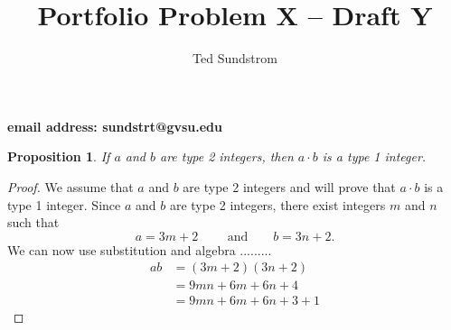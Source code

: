 \documentclass[12pt]{article}
\title{Portfolio Problem X -- Draft Y}
\author{Ted Sundstrom}
\theoremstyle{plain}
\newtheorem{proposition}[theorem]{Proposition}
\begin{document}
\maketitle

\begin{center}
\textbf{email address: sundstrt@gvsu.edu}
\end{center}

\begin{proposition}
If $a$ and $b$ are type 2 integers, then $a \cdot b$ is a type 1 integer.
\end{proposition}

\begin{proof}
We assume that $a$ and $b$ are type 2 integers and will prove that $a \cdot b$ is a type 1 integer.  Since $a$ and $b$ are type 2 integers, there exist integers $m$ and $n$ such that
\[
a = 3m + 2 \text{ ~~~~~~and~~~~~ } b = 3n + 2.
\]
We can now  use substitution and algebra .........
\begin{align*}
ab &= (3m + 2)(3n + 2) \\
    &= 9mn + 6m + 6n + 4 \\
    &= 9mn + 6m + 6n + 3 + 1
\end{align*}
\end{proof}
\end{document}
